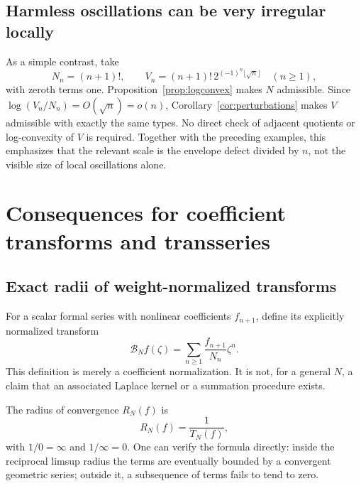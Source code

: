 \documentclass[11pt,a4paper]{article}
\numberwithin{equation}{section}
\theoremstyle{definition}
\theoremstyle{remark}
\newcommand{\Type}{T_N}
\begin{document}
\subsection{Harmless oscillations can be very irregular locally}

As a simple contrast, take
\begin{equation}
 N_n=(n+1)!,\qquad
 V_n=(n+1)!\,2^{(-1)^n\lfloor\sqrt n\rfloor}
 \quad(n\ge1),
 \label{eq:harmlessperturbation}
\end{equation}
with zeroth terms one. Proposition~\ref{prop:logconvex} makes $N$
admissible. Since $\log(V_n/N_n)=O(\sqrt n)=o(n)$,
Corollary~\ref{cor:perturbations} makes $V$ admissible with exactly the
same types. No direct check of adjacent quotients or log-convexity of
$V$ is required. Together with the preceding examples, this emphasizes
that the relevant scale is the envelope defect divided by $n$, not the
visible size of local oscillations alone.

\section{Consequences for coefficient transforms and transseries}
\label{sec:transseries}

\subsection{Exact radii of weight-normalized transforms}

For a scalar formal series with nonlinear coefficients $f_{n+1}$, define
its explicitly normalized transform
\begin{equation}
 \mathcal B_N f(\zeta)=
 \sum_{n\ge1}\frac{f_{n+1}}{N_n}\zeta^n.
 \label{eq:weighttransform}
\end{equation}
This definition is merely a coefficient normalization. It is not, for a
general $N$, a claim that an associated Laplace kernel or a summation
procedure exists.

The radius of convergence $R_N(f)$ is
\begin{equation}
 R_N(f)=\frac1{\Type(f)},
 \label{eq:radius}
\end{equation}
with $1/0=\infty$ and $1/\infty=0$. One can verify the formula directly:
inside the reciprocal limsup radius the terms are eventually bounded by
a convergent geometric series; outside it, a subsequence of terms fails
to tend to zero.
\end{document}
